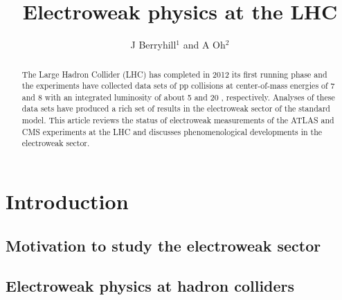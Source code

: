 \documentclass[12pt]{iopart}
\begin{document}
\title[Electroweak phyiscs at the LHC]{Electroweak physics at the LHC}
\author{J Berryhill$^1$ and A Oh$^2$}

\address{$^1$ Fermi National Accelerator Laboratory, Batavia, IL, USA}
\address{$^2$ School of Physics and Astronomy, University of Manchester, Manchester, UK}


\begin{abstract}
The Large Hadron Collider (LHC) has completed in 2012 its first
running phase and the experiments have collected data sets of pp
collisions at center-of-mass energies of 7 and 8 \TeV\xspace with an
integrated luminosity of about 5 \ifb and 20 \ifb, respectively.  Analyses
of these data sets have produced a rich set of results in the
electroweak sector of the standard model. This article reviews the
status of electroweak measurements of the ATLAS and CMS experiments at
the LHC and discusses phenomenological developments in the electroweak
sector.
\end{abstract}

%
%
\submitto{\jpg}
%
\maketitle
% 
%


\section{Introduction}
\subsection{Motivation to study the electroweak sector}
\subsection{Electroweak physics at hadron colliders}
\end{document}
